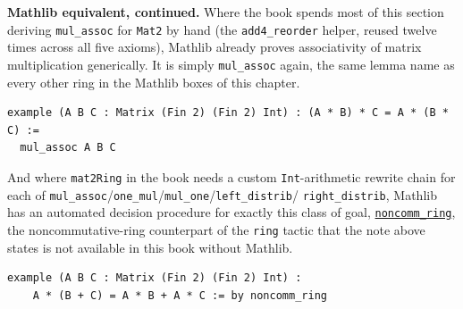 \textbf{Mathlib equivalent, continued.} Where the book spends most of this section deriving \texttt{mul\_\allowbreak{}assoc} for \texttt{Mat2} by hand (the \texttt{add4\_\allowbreak{}reorder} helper, reused twelve times across all five axioms), Mathlib already proves associativity of matrix multiplication generically. It is simply \texttt{mul\_\allowbreak{}assoc} again, the same lemma name as every other ring in the Mathlib boxes of this chapter.

\begin{lstlisting}
example (A B C : Matrix (Fin 2) (Fin 2) Int) : (A * B) * C = A * (B * C) :=
  mul_assoc A B C
\end{lstlisting}

And where \texttt{mat2Ring} in the book needs a custom \texttt{Int}-arithmetic rewrite chain for each of \texttt{mul\_\allowbreak{}assoc}/\texttt{one\_\allowbreak{}mul}/\texttt{mul\_\allowbreak{}one}/\texttt{left\_\allowbreak{}distrib}/ \texttt{right\_\allowbreak{}distrib}, Mathlib has an automated decision procedure for exactly this class of goal, \href{https://lean-lang.org/doc/reference/latest/Tactic-Proofs/Tactic-Reference/}{\texttt{noncomm\_\allowbreak{}ring}}, the noncommutative-ring counterpart of the \texttt{ring} tactic that the note above states is not available in this book without Mathlib.

\begin{lstlisting}
example (A B C : Matrix (Fin 2) (Fin 2) Int) :
    A * (B + C) = A * B + A * C := by noncomm_ring
\end{lstlisting}
